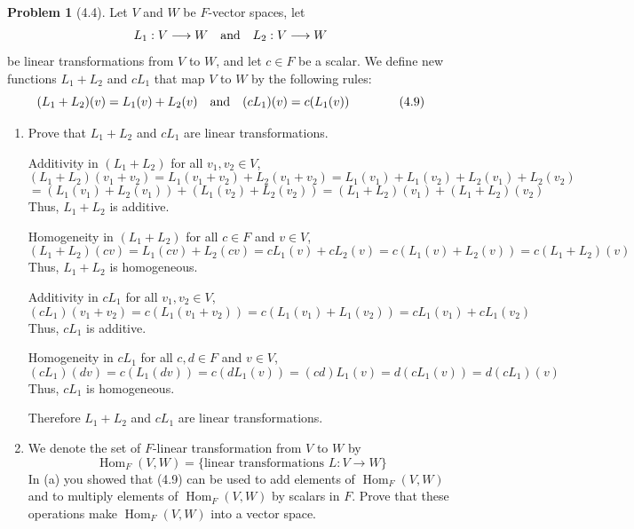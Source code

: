 \documentclass[12pt]{article}
\theoremstyle{definition}
\newtheorem{problem}{Problem}
\DeclareMathOperator{\Hom}{Hom}
\begin{document}
\begin{problem}[4.4]
    Let $V$ and $W$ be $F$-vector spaces, let
    \[
        L_1: V \longrightarrow W \hspace{10px} \text{and} \hspace{10px} L_2: V \longrightarrow W 
    \]
    be linear transformations from $V$ to $W$, and let $c \in F$ be a scalar. We define new functions $L_1 + L_2$
    and $cL_1$ that map $V$ to $W$ by the following rules:
    \[
        (L_1 + L_2)(v) = L_1(v) + L_2(v) \hspace{10px} \text{and} \hspace{10px} (cL_1)(v) = c(L_1(v)) \hspace{40px} \text{(4.9)}
    \]
    \begin{enumerate}[label=(\alph*)]
        \item Prove that $L_1 + L_2$ and $cL_1$ are linear transformations.
        
        \begin{solution}    
            Additivity in $(L_1 + L_2)$ for all $v_1, v_2 \in V$,
            \[ (L_1 + L_2)(v_1 + v_2) = L_1(v_1 + v_2) + L_2(v_1 + v_2) = L_1(v_1) + L_1(v_2) + L_2(v_1) + L_2(v_2) \]
            \[ = (L_1(v_1) + L_2(v_1)) + (L_1(v_2) + L_2(v_2)) = (L_1 + L_2)(v_1) + (L_1 + L_2)(v_2) \]
            Thus, $L_1 + L_2$ is additive.
            
            Homogeneity in $(L_1 + L_2)$ for all $c \in F$ and $v \in V$,
            \[ (L_1 + L_2)(cv) = L_1(cv) + L_2(cv) = cL_1(v) + cL_2(v) = c(L_1(v) + L_2(v)) = c(L_1 + L_2)(v) \]
            Thus, $L_1 + L_2$ is homogeneous.
            
            Additivity in $cL_1$ for all $v_1, v_2 \in V$,
            \[ (cL_1)(v_1 + v_2) = c(L_1(v_1 + v_2)) = c(L_1(v_1) + L_1(v_2)) = cL_1(v_1) + cL_1(v_2) \]
            Thus, $cL_1$ is additive.
            
            Homogeneity in $cL_1$ for all $c, d \in F$ and $v \in V$,
            \[ (cL_1)(dv) = c(L_1(dv)) = c(dL_1(v)) = (cd)L_1(v) = d(cL_1(v)) = d(cL_1)(v) \]
            Thus, $cL_1$ is homogeneous.
            
            Therefore $L_1 + L_2$ and $cL_1$ are linear transformations.

        \end{solution}

        \item We denote the set of $F$-linear transformation from $V$ to $W$ by
              \[
                \Hom_F(V, W) = \{ \text{linear transformations } L: V \longrightarrow W \}
              \]
              In (a) you showed that (4.9) can be used to add elements of $\Hom_F(V, W)$ and to multiply elements of $\Hom_F(V, W)$
              by scalars in $F$. Prove that these operations make $\Hom_F(V, W)$ into a vector space.
        

\end{enumerate}
\end{problem}
\end{document}
